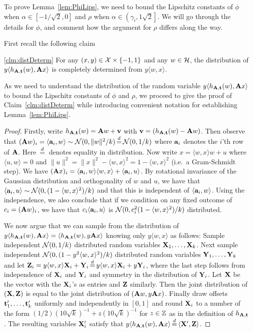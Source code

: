 To prove Lemma~\ref{lem:PhiLips}, we need to bound the Lipschitz constants of $\phi$ when $\alpha\in [-1/\sqrt{2}, 0]$ and $\rho$ when $\alpha\in \left(\gamma_i,1\sqrt{2}\right]$.
We will go through the details for $\phi$, and comment how the argument for $\rho$ differs along the way.

First recall the following claim
\begin{customclm}{\ref{clm:distDeterm}}
For any $(x,y) \in \mathcal{X} \times \{-1,1\}$ and any $w \in \mathcal{H}$, the distribution of $y \langle h_{\mathbf{A},\mathbf{t}}(w),\mathbf{A} x \rangle$ is completely determined from $y \langle w, x \rangle$. 
\end{customclm}

As we need to understand the distribution of the random variable $y \langle h_{\mathbf{A},\mathbf{t}}(w),\mathbf{A} x \rangle$ to bound the Lipschitz constants of $\phi$ and $\rho$, we proceed to give the proof of Claim~\ref{clm:distDeterm} while introducing convenient notation for establishing Lemma~\ref{lem:PhiLips}.

\begin{proof}
Firstly, write $h_{\mathbf{A},\mathbf{t}}(w) =\mathbf{A} w + \mathbf{v}$ with $\mathbf{v} =(h_{\mathbf{A},\mathbf{t}}(w)-\mathbf{A} w)$. Then observe that $(\rA w)_i = \langle \ra_i, w\rangle \sim \Norm(0, \|w\|^2/k) \eqd \Norm(0,1/k)$ where $\mathbf{a}_i$ denotes the $i$'th row of $\mathbf{A}$. Here $\eqd$ denotes equality in distribution. Now write $x = \langle w, x \rangle w + u$ where $\langle u, w \rangle = 0$ and $\|u\|^2 = \|x\|^2-\langle w,x \rangle^2 = 1-\langle w,x \rangle^2$ (i.e.\ a Gram-Schmidt step). We have $(\mathbf{A} x)_i = \langle \mathbf{a}_i , w\rangle \langle w,x\rangle + \langle \mathbf{a}_i , u\rangle$. By rotational invariance of the Gaussian distribution and orthogonality of $w$ and $u$, we have that $\langle \mathbf{a}_i , u \rangle \sim \mathcal{N}(0,(1-\langle w, x\rangle^2)/k)$ and that this is independent of $\langle \mathbf{a}_i, w \rangle$. Using the independence, we also conclude that if we condition on any fixed outcome of $c_i = (\mathbf{A} w)_i$, we have that $c_i \langle \mathbf{a}_i, u \rangle$ is $\mathcal{N}(0, c^2_i (1-\langle w , x \rangle^2)/k)$ distributed.

We now argue that we can sample from the distribution of $y \langle h_{\mathbf{A},\mathbf{t}}(w), \mathbf{A} x \rangle = \langle h_{\mathbf{A},\mathbf{t}}(w), y \mathbf{A} x \rangle$ knowing only $y \langle w, x \rangle$ as follows: Sample independent $\mathcal{N}(0,1/k)$ distributed random variables $\mathbf{X}_1,\dots,\mathbf{X}_k$. Next sample independent $\mathcal{N}(0,(1-y^2 \langle w, x\rangle^2)/k)$ distributed random variables $\mathbf{Y}_1,\dots,\mathbf{Y}_k$ and let $\rZ_i = y \langle w, x \rangle \rX_i + \rY_i \eqd y \langle w, x \rangle \rX_i + y\rY_i$, where the last step follows from independence of $\mathbf{X}_i$ and $\mathbf{Y}_i$ and symmetry in the distribution of $\mathbf{Y}_i$. Let $\mathbf{X}$ be the vector with the $\mathbf{X}_i$'s as entries and $\mathbf{Z}$ similarly. Then the joint distribution of $(\mathbf{X}, \mathbf{Z})$ is equal to the joint distribution of $(\mathbf{A} w, y\mathbf{A} x)$. Finally draw offsets $\mathbf{t}'_1,\dots,\mathbf{t}'_k$ uniformly and independently in $[0,1]$ and round $\mathbf{X}_i$ to a number of the form $(1/2)(10\sqrt{k})^{-1} + z(10\sqrt{k})^{-1}$ for $z \in \mathbb{Z}$ as in the definition of $h_{\mathbf{A},\mathbf{t}}$. The resulting variables $\mathbf{X}_i'$ satisfy that $y \langle h_{\rA, \rt}(w), \rA x \rangle \eqd \langle \rX', \rZ \rangle$.
\end{proof}

